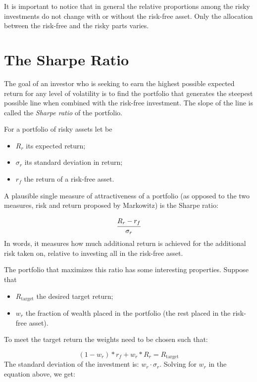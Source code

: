 It is important to notice that in general the relative proportions among the risky investments do not change with or without the risk-free asset. Only the allocation between the risk-free and the risky parts varies.

\section{The Sharpe Ratio}
\label{the-sharpe-ratio}
The goal of an investor who is seeking to earn the highest possible expected return for any level of volatility is to find the portfolio that generates the steepest possible line when combined with the risk-free investment. The slope of the line is called the \emph{Sharpe ratio} of the portfolio.

For a portfolio of risky assets let be

\begin{itemize}
\tightlist
\item \(R_r\) its expected return;
\item \(\sigma_r\) its standard deviation in return;
\item \(r_f\) the return of a risk-free asset.
\end{itemize}

A plausible single measure of attractiveness of a portfolio (as opposed to the two measures, risk and return proposed by Markowitz) is the Sharpe ratio:

\begin{equation} \cfrac{R_r - r_f}{\sigma_r} \end{equation}
\noindent
In words, it measures how much additional return is achieved for the additional risk taken on, relative to investing all in the risk-free asset. 

The portfolio that maximizes this ratio has some interesting properties. Suppose that

\begin{itemize}
\tightlist
\item
  \(R_\textrm{target}\) the desired target return;
\item
  \(w_r\) the fraction of wealth placed in the portfolio (the rest placed in the risk-free asset).
\end{itemize}
\noindent
To meet the target return the weights need to be chosen such that:

\begin{equation*} 
(1 - w_r) * r_f + w_r * R_r =R_\textrm{target} 
\end{equation*}
\noindent
The standard deviation of the investment is: \(w_r\cdot \sigma_r\). Solving for \(w_r\) in the equation above, we get:


